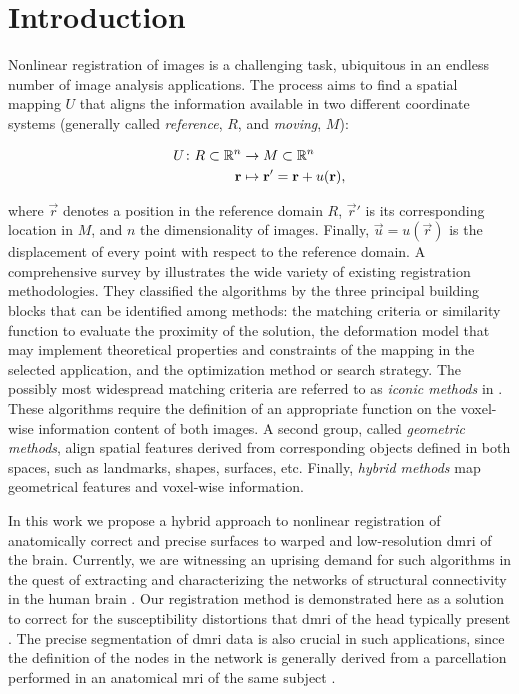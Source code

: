 \section*{Introduction}\label{sec:introduction}
Nonlinear registration of images is a challenging task, ubiquitous
  in an endless number of image analysis applications.
The process aims to find a spatial mapping $U$ that aligns the information available
  in two different coordinate systems (generally called
  \emph{reference}, $R$, and \emph{moving}, $M$):%

  \begin{align}
  U\colon R \subset \mathbb{R}^n &\to M \subset \mathbb{R}^n \notag\\
  \vec{r} &\mapsto \vec{r}' =\vec{r}+u(\vec{r}),
  \label{eq:transform}
  \end{align}

  where $\vec{r}$ denotes a position in the reference domain $R$, $\vec{r}'$ is
  its corresponding location in $M$, and $n$ the dimensionality of images.
Finally, $\vec{u} = u(\vec{r})$ is the displacement of every point with respect
  to the reference domain.
A comprehensive survey by \cite{sotiras_deformable_2013}
  illustrates the wide variety of existing registration methodologies.
They classified the algorithms by the three principal building blocks that can be identified
  among methods: the matching criteria or similarity function to evaluate the proximity of
  the solution, the deformation model that may implement theoretical properties and constraints
  of the mapping in the selected application, and the optimization method or search strategy.
The possibly most widespread matching criteria are referred to as \emph{iconic
  methods} in \citep{sotiras_deformable_2013}.
These algorithms require the definition of an appropriate function on the voxel-wise information
  content of both images.
A second group, called \emph{geometric methods}, align spatial features derived from
  corresponding objects defined in both spaces, such as landmarks, shapes, surfaces, etc.
Finally, \emph{hybrid methods} map geometrical features and voxel-wise information.

In this work we propose a hybrid approach to nonlinear registration of anatomically correct
  and precise surfaces to warped and low-resolution \gls*{dmri} of the brain.
Currently, we are witnessing an uprising demand for such algorithms in the quest
  of extracting and characterizing the networks of structural connectivity in the
  human brain \citep{craddock_imaging_2013}.
Our registration method is demonstrated here as a solution to correct for the susceptibility
  distortions that \gls*{dmri} of the head typically present \citep{jezzard_correction_1995}.
The precise segmentation of \gls*{dmri} data is also crucial in such applications, since the
  definition of the nodes in the network is generally derived from a parcellation performed in
  an anatomical \gls*{mri} of the same subject \citep{daducci_connectome_2012}.

